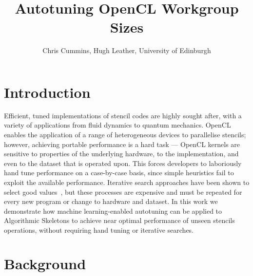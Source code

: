 \documentclass[times, 10pt,twocolumn]{article}
\begin{document}
\title{
\vspace{-0.8in}
Autotuning OpenCL Workgroup Sizes
\vspace{-0.2in}
}
\author{Chris Cummins, Hugh Leather, University of Edinburgh
}

\maketitle
\thispagestyle{empty}

\section{Introduction}
\label{intro}

Efficient, tuned implementations of stencil codes are highly sought
after, with a variety of applications from fluid dynamics to quantum
mechanics. OpenCL enables the application of a range of heterogeneous
devices to parallelise stencils; however, achieving portable
performance is a hard task --- OpenCL kernels are sensitive to
properties of the underlying hardware, to the implementation, and even
to the dataset that is operated upon. This forces developers to
laboriously hand tune performance on a case-by-case basis, since
simple heuristics fail to exploit the available performance. Iterative
search approaches have been shown to select good
values~\cite{Nugteren2015,Ansel2013,Zhang2013a}, but these processes
are expensive and must be repeated for every new program or change to
hardware and dataset. In this work we demonstrate how machine
learning-enabled autotuning can be applied to Algorithmic Skeletons to
achieve near optimal performance of unseen stencils operations,
without requiring hand tuning or iterative searches.

\section{Background}

\end{document}
